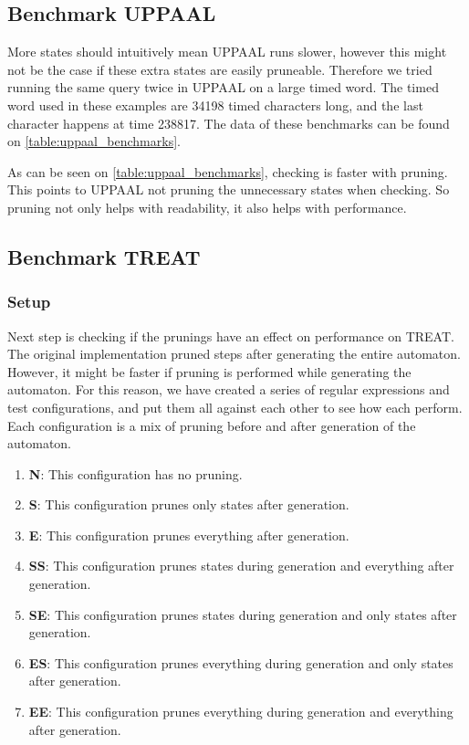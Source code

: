 \subsection{Benchmark UPPAAL}\label{sub:benchmark_uppaal}
More states should intuitively mean UPPAAL runs slower, however this might not be the case if these extra states are easily pruneable.
Therefore we tried running the same query twice in UPPAAL on a large timed word.
The timed word used in these examples are 34198 timed characters long, and the last character happens at time 238817.
The data of these benchmarks can be found on \cref{table:uppaal_benchmarks}.



As can be seen on \cref{table:uppaal_benchmarks}, checking is faster with pruning.
This points to UPPAAL not pruning the unnecessary states when checking.
So pruning not only helps with readability, it also helps with performance. 

\subsection{Benchmark TREAT}
\subsubsection{Setup}
Next step is checking if the prunings have an effect on performance on TREAT.
The original implementation pruned steps after generating the entire automaton.
However, it might be faster if pruning is performed while generating the automaton.
For this reason, we have created a series of regular expressions and test configurations, and put them all against each other to see how each perform.
Each configuration is a mix of pruning before and after generation of the automaton.

\begin{enumerate}
    \item \textbf{N}: This configuration has no pruning.
    \item \textbf{S}: This configuration prunes only states after generation.
    \item \textbf{E}: This configuration prunes everything after generation.
    \item \textbf{SS}: This configuration prunes states during generation and everything after generation.
    \item \textbf{SE}: This configuration prunes states during generation and only states after generation.
    \item \textbf{ES}: This configuration prunes everything during generation and only states after generation.
    \item \textbf{EE}: This configuration prunes everything during generation and everything after generation.
\end{enumerate}

